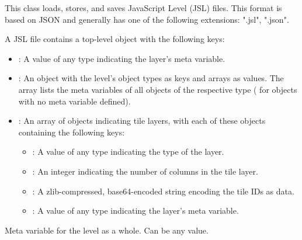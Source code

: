 \documentclass[letterpaper,10pt,english]{sphinxmanual}
\begin{document}
\begin{fulllineitems}
\label{\detokenize{index:ulvl.JSL}}
This class loads, stores, and saves JavaScript Level (JSL) files.
This format is based on JSON and generally has one of the following
extensions: ".jsl", ".json".

A JSL file contains a top-level object with the following keys:
\begin{itemize}
\item {} 
: A value of any type indicating the layer's meta
variable.

\item {} 
: An object with the level's object types as keys and
arrays as values.  The array lists the meta variables of all
objects of the respective type ( for objects with no meta
variable defined).

\item {} 
: An array of objects indicating tile layers, with
each of these objects containing the following keys:
\begin{itemize}
\item {} 
: A value of any type indicating the type of the
layer.

\item {} 
: An integer indicating the number of columns in
the tile layer.

\item {} 
: A zlib-compressed, base64-encoded string encoding
the tile IDs as data.

\item {} 
: A value of any type indicating the layer's meta
variable.

\end{itemize}

\end{itemize}

\begin{fulllineitems}
\label{\detokenize{index:ulvl.JSL.meta}}
Meta variable for the level as a whole.  Can be any value.


\end{fulllineitems}
\end{fulllineitems}
\end{document}
